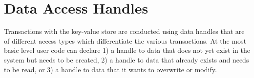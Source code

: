 %
%
%
%
%
%
%
%



\section{Data Access Handles}
\label{sec:handles}


Transactions with the \gls{key-value store} are conducted using data handles that are of different access types which differentiate the 
various transactions. 
At the most basic level user code can declare 
1) a handle to data that does not yet exist in the system
but needs to be created, 
2) a handle to data that already exists and needs to
be read, or 
3) a handle to data that it wants to overwrite or modify. 

